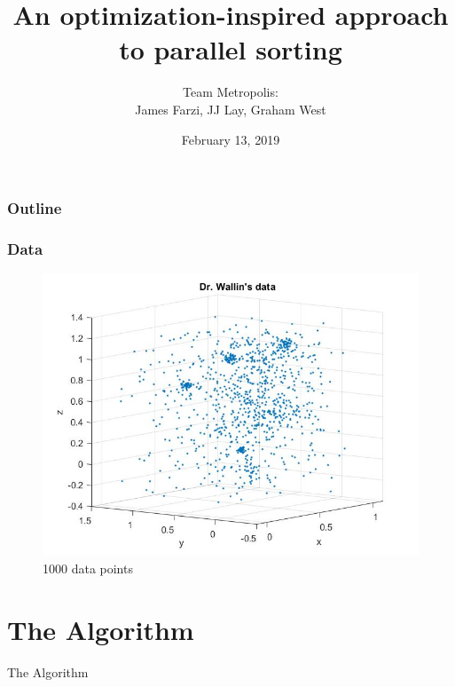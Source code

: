 \documentclass{beamer}
\title[Capstone]{An optimization-inspired approach to parallel sorting}
\author{Team Metropolis:\\
James Farzi, JJ Lay, Graham West}
\date{February 13, 2019}
\begin{document}
\frame{\titlepage}

\begin{frame}	
	\frametitle{Outline}
	\tableofcontents	
\end{frame}

\begin{frame}
	\frametitle{Data}
	
	\begin{figure}[!htb]
		\centering
		\vspace{-5pt}
		\includegraphics[scale = 0.4]{WallinDataPlot}
		\vspace{-10pt}
		\caption{1000 data points}
	\end{figure}
\end{frame}

\section{The Algorithm}

\begin{frame}	
	\begin{Huge}
		\begin{center}
			The Algorithm
		\end{center}
	\end{Huge}
\end{frame}
\end{document}

